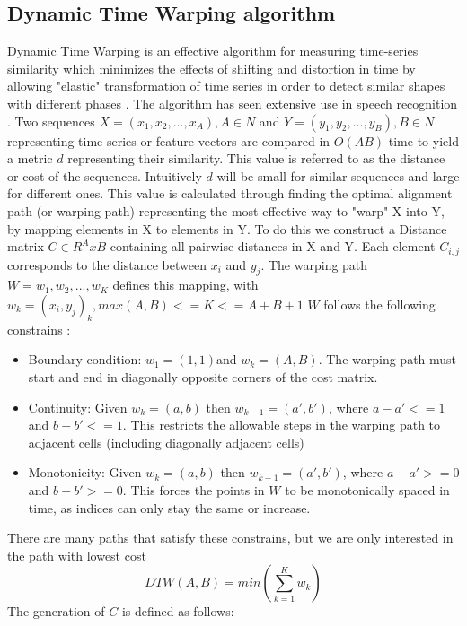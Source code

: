     \subsection{Dynamic Time Warping algorithm}
    Dynamic Time Warping is an effective algorithm for measuring time-series similarity which minimizes the effects of shifting and distortion in time by allowing "elastic" transformation of time series in order to detect similar shapes with different phases \cite{DTW}. The algorithm has seen extensive use in speech recognition \cite{sakoechiba}. Two sequences $X = (x_1, x_2, ... , x_A), A \in N $ and $Y = (y_1, y_2, ... , y_B), B \in N $ representing time-series or feature vectors are compared in $O(AB)$ time to yield a metric $d$ representing their similarity. This value is referred to as  the distance or cost of the sequences. Intuitively $d$ will be small for similar sequences and large for different ones. This value is calculated through finding the optimal alignment path (or warping path) representing the most effective way to "warp" X into Y, by mapping elements in X to elements in Y. To do this we construct a Distance matrix $C \in R^AxB$ containing all pairwise distances in X and Y. Each element $C_{i,j}$ corresponds to the distance between $x_i$ and $y_j$.   The warping path $W = w_1, w_2, ... , w_K $ defines this mapping, with $w_k = (x_i,y_j)_k, max(A,B) <= K <= A+B+1$ 
    $W$ follows the following constrains \cite{chu2002iterative}:
    \begin{itemize}
        \item Boundary condition: $w_1 = (1,1)$and $w_k = (A,B)$. The warping path must start and end in diagonally opposite corners of the cost matrix.
        \item Continuity: Given $w_k = (a,b)$ then $w_{k-1} = (a',b')$, where $a - a'<= 1$ and $b - b'<= 1$. This restricts the allowable steps in the warping path to adjacent cells (including diagonally adjacent cells)
        \item Monotonicity: Given $w_k = (a,b)$ then $w_{k-1} = (a',b')$, where $a - a' >= 0$ and $b - b' >= 0.$ This forces the points in $W$ to be monotonically spaced in time, as indices can only stay the same or increase. 
    \end{itemize}
    There are many paths that satisfy these constrains, but we are only interested in the path with lowest cost 
    \begin{equation}
        DTW(A,B) = min(\sum_{k=1}^K w_k)        
    \end{equation}
    The generation of $C$ is defined as follows:
